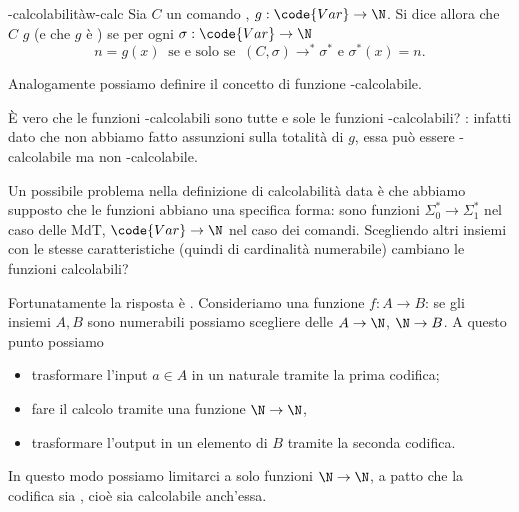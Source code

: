 \begin{definition}
    {-calcolabilità}{w-calc}
    Sia $C$ un comando , $g : \code{Var} \to \N$. 
    Si dice allora che $C$  $g$ (e che $g$ è ) se per ogni $\sigma : \code{Var} \to \N$ \[
        n = g(x) \;\;\text{se e solo se}\;\; (C, \sigma) \to^\ast \sigma^\ast \text{ e } \sigma^\ast(x) = n.
    \]   
\end{definition}

Analogamente possiamo definire il concetto di funzione -calcolabile.

È vero che le funzioni -calcolabili sono tutte e sole le funzioni -calcolabili? : infatti dato che non abbiamo fatto assunzioni sulla totalità di $g$, essa può essere -calcolabile ma non -calcolabile.

Un possibile problema nella definizione di calcolabilità data è che abbiamo supposto che le funzioni abbiano una specifica forma: sono funzioni $\Sigma_0^\ast \to \Sigma_1^\ast$ nel caso delle MdT, $\code{Var} \to \N$ nel caso dei comandi. Scegliendo altri insiemi con le stesse caratteristiche (quindi di cardinalità numerabile) cambiano le funzioni calcolabili?

Fortunatamente la risposta è . Consideriamo una funzione $f : A \to B$: se gli insiemi $A, B$ sono numerabili possiamo scegliere delle  $A \to \N$, $\N \to B$. A questo punto possiamo \begin{itemize}
    \item trasformare l'input $a \in A$ in un naturale tramite la prima codifica;
    \item fare il calcolo tramite una funzione $\N \to \N$,
    \item trasformare l'output in un elemento di $B$ tramite la seconda codifica. 
\end{itemize}

In questo modo possiamo limitarci a solo funzioni $\N \to \N$, a patto che la codifica sia , cioè sia calcolabile anch'essa.